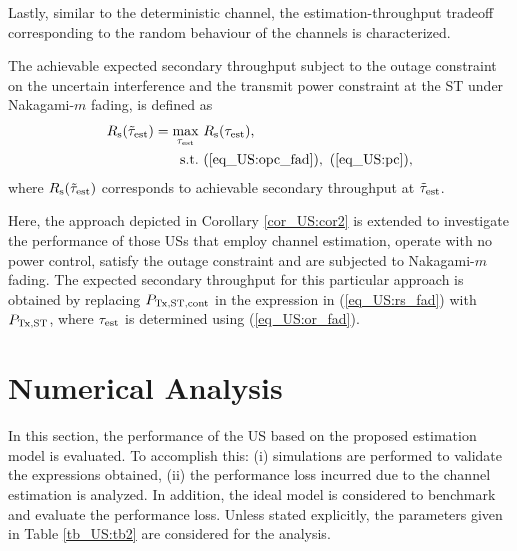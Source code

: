 Lastly, similar to the deterministic channel, the estimation-throughput tradeoff corresponding to the random behaviour of the channels is characterized. 
\begin{theorem} \label{th_US:th2}
\normalfont
The achievable expected secondary throughput subject to the outage constraint on the uncertain interference and the transmit power constraint at the ST under Nakagami-$m$ fading, is defined as
\begin{align}
R_{\text{s}}(\tilde{\tau}_{\text{est}}) = \operatorname*{max}_{\tau_{\text{est}}}  & \text{      } {R_{\text{s}}(\tau_{\text{est}})}, 
 \label{eq_US:sys_fad} \\
\text{s.t.} & \text{ } (\ref{eq_US:opc_fad}), \text{  } (\ref{eq_US:pc}), \nonumber 
 \end{align}
where $R_{\text{s}}(\tilde{\tau}_{\text{est}})$ corresponds to achievable secondary throughput at $\tilde{\tau}_{\text{est}}$.  
\end{theorem}

\begin{coro} \label{cor_US:cor3}
\normalfont
Here, the approach depicted in Corollary \ref{cor_US:cor2} is extended to investigate the performance of those USs that employ channel estimation, operate with no power control, satisfy the outage constraint and are subjected to Nakagami-$m$ fading. The expected secondary throughput for this particular approach is obtained by replacing $P_{\text{Tx,ST,cont}}$ in the expression in (\ref{eq_US:rs_fad}) with $P_{\text{Tx,ST}}$, where $\tau_{\text{est}}$ is determined using (\ref{eq_US:or_fad}). 

\end{coro}
 
\section{Numerical Analysis} \label{sec_US:num_ana}
In this section, the performance of the US based on the proposed estimation model is evaluated. To accomplish this: (i) simulations are performed to validate the expressions obtained, (ii) the performance loss incurred due to the channel estimation is analyzed. In addition, the ideal model is considered to benchmark and evaluate the performance loss. %
Unless stated explicitly, the parameters given in Table \ref{tb_US:tb2} are considered for the analysis.%


